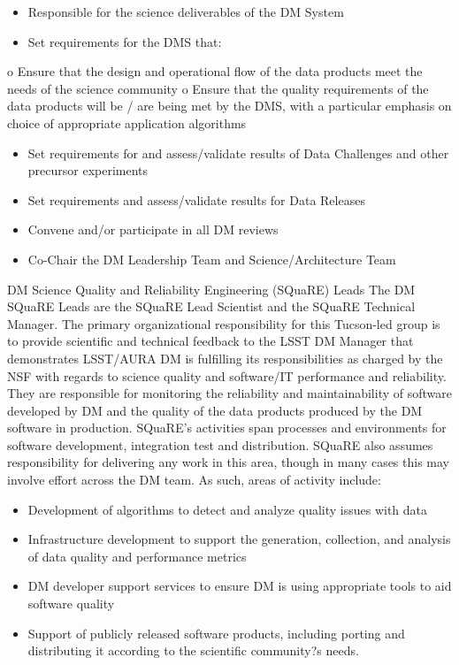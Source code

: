 \begin{itemize}
\begin{itemize}
\item Responsible for the science deliverables of the DM System
\item Set requirements for the DMS that:
\end{itemize}
o Ensure that the design and operational flow of the data products meet the needs of the science community
o Ensure that the quality requirements of the data products will be / are being met by the DMS, with a particular emphasis on choice of appropriate application algorithms
\begin{itemize}
\item Set requirements for and assess/validate results of Data Challenges and other precursor experiments
\item Set requirements and assess/validate results for Data Releases
\item Convene and/or participate in all DM reviews
\item Co-Chair the DM Leadership Team and Science/Architecture Team
\end{itemize}
DM Science Quality and Reliability Engineering (SQuaRE) Leads
The DM SQuaRE Leads are the SQuaRE Lead Scientist and the SQuaRE Technical Manager.  The primary organizational responsibility for this Tucson-led group is to provide scientific and technical feedback to the LSST DM Manager that demonstrates LSST/AURA DM is fulfilling its responsibilities as charged by the NSF with regards to science quality and software/IT performance and reliability.
They are responsible for monitoring the reliability and maintainability of software developed by DM and the quality of the data products produced by the DM software in production. SQuaRE's activities span processes and environments for software development, integration test and distribution.  SQuaRE also assumes responsibility for delivering any work in this area, though in many cases this may involve effort across the DM team. 
As such, areas of activity include:
\begin{itemize}
\item Development of algorithms to detect and analyze quality issues with data
\item Infrastructure development to support the generation, collection, and analysis of data quality and performance metrics
\item DM developer support services to ensure DM is using appropriate tools to aid software quality
\item Support of publicly released software products, including porting and distributing it according to the scientific community?s needs.
\end{itemize}


\end{itemize}
